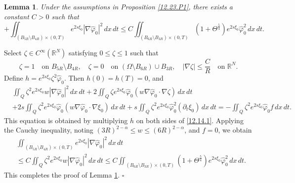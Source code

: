 \documentclass[11pt]{article}
\newtheorem{lemma}{Lemma}[section]
\newenvironment{proof}{{\bf {Proof.}}}{\hfill $\square$}
\numberwithin{equation}{section}
\def\bf{\textbf}
\begin{document}
\begin{lemma}\label{12.23.L1}
Under the assumptions in Proposition \ref{12.23.P1}, there exists a constant $C>0$ such that
\begin{equation*}
+\iint_{(B_{5R}\setminus B_{4R})\times (0,T)}e^{2s\xi_0}|\nabla \widehat{\varphi}_0|^2\,dx\,dt\leq C\iint_{(B_{6R}\setminus B_{3R})\times (0,T)}(1+
\Theta^{\frac{5}{4}})e^{2s\xi_0}\widehat{\varphi}_0^2\,dx\,dt.
\end{equation*}
\end{lemma}
 \begin{proof}
Select $\zeta \in C^{\infty}(\mathbb{R}^N)$ satisfying $0 \leq \zeta \leq 1$ such that
\begin{equation*}
\zeta = 1 \quad \text{on } B_{5R} \setminus B_{4R}, \quad \zeta = 0 \quad \text{on } (\Omega \setminus B_{6R}) \cup B_{3R}, \quad |\nabla \zeta| \leq \frac{C}{R} \quad \text{on } \mathbb{R}^N.
\end{equation*}
Define $h = e^{2s\xi_0}\zeta^2 \widehat{\varphi}_0$. Then $h(0) = h(T) = 0$, and
\begin{equation*}
\begin{split}
&\iint_Q \zeta^2 e^{2s\xi_0} w |\nabla \widehat{\varphi}_0|^2 \, dx \, dt + 2\iint_Q \zeta e^{2s\xi_0} \widehat{\varphi}_0 (w \nabla \widehat{\varphi}_0 \cdot \nabla \zeta) \, dx \, dt \\
&+ 2s\iint_Q \zeta^2 e^{2s\xi_0} \widehat{\varphi}_0 (w \nabla \widehat{\varphi}_0 \cdot \nabla \xi_0) \, dx \, dt + s\iint_Q \zeta^2 e^{2s\xi_0} \widehat{\varphi}_0^2 (\partial_t \xi_0) \, dx \, dt = -\iint_Q \zeta^2 e^{2s\xi_0} \widehat{\varphi}_0 f \, dx \, dt.
\end{split}
\end{equation*}
This equation is obtained by multiplying $h$ on both sides of \eqref{12.14.1}. Applying the Cauchy inequality, noting $(3R)^{2-\alpha} \leq w \leq (6R)^{2-\alpha}$, and $f = 0$, we obtain
\begin{equation*}
\begin{split}
&\iint_{(B_{5R} \setminus B_{4R}) \times (0,T)} e^{2s\xi_0} |\nabla \widehat{\varphi}_0|^2 \, dx \, dt \\
&\leq C\iint_Q \zeta^2 e^{2s\xi_0} w |\nabla \widehat{\varphi}_0|^2 \, dx \, dt \leq C\iint_{(B_{6R} \setminus B_{3R}) \times (0,T)} (1 + \Theta^{\frac{5}{4}}) e^{2s\xi_0} \widehat{\varphi}_0^2 \, dx \, dt.
\end{split}
\end{equation*}
This completes the proof of Lemma \ref{12.23.L1}.
\end{proof}
\end{document}
